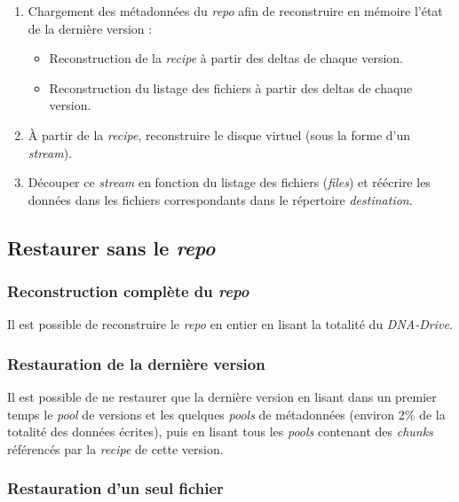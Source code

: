 \documentclass[a4paper]{article}
\begin{document}
\begin{enumerate}
\item
  Chargement des métadonnées du \emph{repo} afin de reconstruire en
  mémoire l'état de la dernière version :

  \begin{itemize}
  \item
    Reconstruction de la \emph{recipe} à partir des deltas de chaque
    version.
  \item
    Reconstruction du listage des fichiers à partir des deltas de chaque
    version.
  \end{itemize}
\item
  À partir de la \emph{recipe}, reconstruire le disque virtuel (sous la
  forme d'un \emph{stream}).
\item
  Découper ce \emph{stream} en fonction du listage des fichiers
  (\emph{files}) et réécrire les données dans les fichiers
  correspondants dans le répertoire \emph{destination}.
\end{enumerate}

\subsection{\texorpdfstring{Restaurer sans le
\emph{repo}}{Restaurer sans le repo}}

\subsubsection{\texorpdfstring{Reconstruction complète du
\emph{repo}}{Reconstruction complète du repo}}

Il est possible de reconstruire le \emph{repo} en entier en lisant la
totalité du \emph{DNA-Drive}.

\subsubsection{Restauration de la dernière
version}

Il est possible de ne restaurer que la dernière version en lisant dans
un premier temps le \emph{pool} de versions et les quelques \emph{pools}
de métadonnées (environ 2\% de la totalité des données écrites), puis en
lisant tous les \emph{pools} contenant des \emph{chunks} référencés par
la \emph{recipe} de cette version.

\subsubsection{Restauration d'un seul
fichier}
\end{document}
